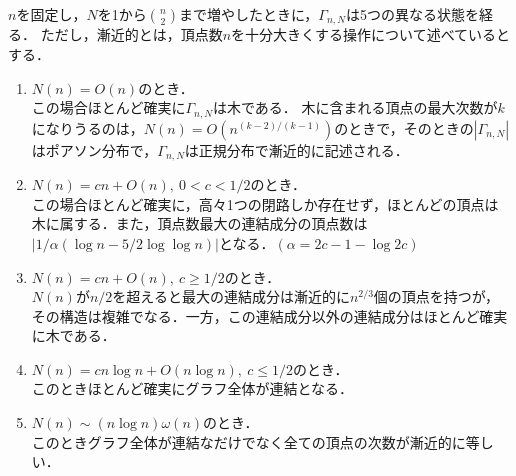 \documentclass[../main]{subfiles}
\begin{document}
$n$を固定し，$N$を1から$\binom{n}{2}$まで増やしたときに，$\Gamma_{n,N}$は5つの異なる状態を経る．
ただし，漸近的とは，頂点数$n$を十分大きくする操作について述べているとする．
\renewcommand{\labelenumi}{Phase \theenumi}
\begin{enumerate}
    \item 
    $N(n)=O(n)$のとき．\\
    この場合ほとんど確実に$\Gamma_{n,N}$は木である．
    木に含まれる頂点の最大次数が$k$になりうるのは，$N(n)=O(n^{(k-2)/(k-1)})$のときで，そのときの$|\Gamma_{n,N}|$はポアソン分布で，$\Gamma_{n,N}$は正規分布で漸近的に記述される．
    \item
    $N(n)=cn+O(n),\ 0<c<1/2$のとき．\\
    この場合ほとんど確実に，高々1つの閉路しか存在せず，ほとんどの頂点は木に属する．また，頂点数最大の連結成分の頂点数は$|1/\alpha(\log n-5/2\log\log n)|$となる．$(\alpha=2c-1-\log 2c)$
    \item
    $N(n)=cn+O(n),\ c\geq 1/2$のとき．\\
    $N(n)$が$n/2$を超えると最大の連結成分は漸近的に$n^{2/3}$個の頂点を持つが，その構造は複雑でなる．一方，この連結成分以外の連結成分はほとんど確実に木である．
    \item
    $N(n)=cn\log n+O(n\log n),\ c\leq 1/2$のとき．\\
    このときほとんど確実にグラフ全体が連結となる．
    \item
    $N(n)\sim(n\log n)\omega(n)$のとき．\\
    このときグラフ全体が連結なだけでなく全ての頂点の次数が漸近的に等しい．
\end{enumerate}
\renewcommand{\labelenumi}{\theenumi}
\end{document}
